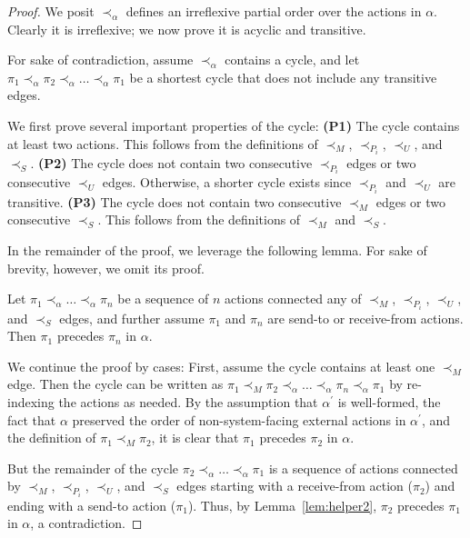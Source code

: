 \begin{proof}
We posit $\prec_{\alpha}$ defines an irreflexive partial order
over the actions in $\alpha$. Clearly it is irreflexive; we now prove
it is acyclic and transitive.

For sake of contradiction, assume $\prec_{\alpha}$ contains a cycle, and
let $\pi_1 \prec_{\alpha} \pi_2 \prec_{\alpha} \ldots \prec_{\alpha} \pi_1$
be a shortest cycle that does not include any transitive edges.

We first prove several important properties of the cycle:
\textbf{(P1)} The cycle contains at least two actions.
This follows from the definitions of $\prec_M$, $\prec_{P_i}$,
$\prec_U$, and $\prec_S$.
\textbf{(P2)} The cycle does not contain two consecutive
$\prec_{P_i}$ edges or two consecutive $\prec_U$ edges. Otherwise, a 
shorter cycle exists since $\prec_{P_i}$ and $\prec_U$ are transitive.
\textbf{(P3)} The cycle does not contain two consecutive
$\prec_M$ edges or two consecutive $\prec_S$. This follows from the 
definitions of $\prec_M$ and $\prec_S$.

In the remainder of the proof, we leverage the following lemma. For
sake of brevity, however, we omit its proof.

\begin{lem}
    Let $\pi_1 \prec_{\alpha} \ldots \prec_{\alpha} \pi_n$
    be a sequence of $n$ actions connected any of $\prec_M$,
    $\prec_{P_i}$, $\prec_U$, and $\prec_S$ edges, and further
    assume $\pi_1$ and $\pi_n$ are send-to or receive-from actions.
    Then $\pi_1$ precedes $\pi_n$ in $\alpha$.
    \label{lem:helper2}
\end{lem}

We continue the proof by cases: First, assume the cycle contains at least one $\prec_M$ edge. Then the cycle can be written as
$\pi_1 \prec_M \pi_2 \prec_{\alpha} \ldots \prec_{\alpha} \pi_n \prec_{\alpha} \pi_1$ 
by re-indexing the actions as needed. By the assumption that $\alpha^\prime$ is well-formed,
the fact that $\alpha$ preserved the order of non-system-facing external actions
in $\alpha^\prime$,
and the definition of $\pi_1 \prec_M \pi_2$, it is clear that $\pi_1$ precedes $\pi_2$ in $\alpha$.

But the remainder of the cycle
$\pi_2 \prec_{\alpha} \ldots \prec_{\alpha} \pi_1$
is a sequence of actions connected by $\prec_M$, $\prec_{P_i}$, $\prec_U$, and $\prec_S$ edges
starting with a receive-from action ($\pi_2$) and ending with a send-to action
($\pi_1$). Thus, by Lemma~\ref{lem:helper2}, $\pi_2$ precedes $\pi_1$ in $\alpha$,
a contradiction.


\end{proof}
